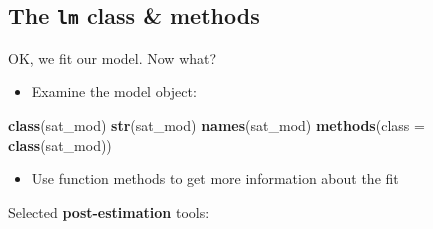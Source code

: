 \documentclass[]{book}
\newenvironment{Shaded}{\begin{snugshade}}{\end{snugshade}}
\newcommand{\DataTypeTok}[1]{\textcolor[rgb]{0.13,0.29,0.53}{#1}}
\newcommand{\KeywordTok}[1]{\textcolor[rgb]{0.13,0.29,0.53}{\textbf{#1}}}
\newcommand{\NormalTok}[1]{#1}
\newcommand{\OperatorTok}[1]{\textcolor[rgb]{0.81,0.36,0.00}{\textbf{#1}}}
\newcommand{\StringTok}[1]{\textcolor[rgb]{0.31,0.60,0.02}{#1}}
\providecommand{\tightlist}{%
  \setlength{\itemsep}{0pt}\setlength{\parskip}{0pt}}
\begin{document}
\hypertarget{the-lm-class-methods}{%
\subsection{\texorpdfstring{The \texttt{lm} class \& methods}{The lm class \& methods}}\label{the-lm-class-methods}}

OK, we fit our model. Now what?

\begin{itemize}
\tightlist
\item
  Examine the model object:
\end{itemize}

\begin{Shaded}
\begin{Highlighting}[]
  \KeywordTok{class}\NormalTok{(sat_mod)}
  \KeywordTok{str}\NormalTok{(sat_mod)}
  \KeywordTok{names}\NormalTok{(sat_mod)}
  \KeywordTok{methods}\NormalTok{(}\DataTypeTok{class =} \KeywordTok{class}\NormalTok{(sat_mod))}
\end{Highlighting}
\end{Shaded}

\begin{itemize}
\tightlist
\item
  Use function methods to get more information about the fit
\end{itemize}

\begin{Shaded}
\end{Shaded}

Selected \textbf{post-estimation} tools:
\end{document}

